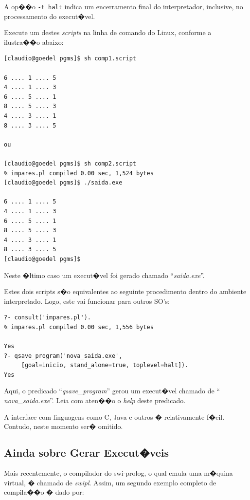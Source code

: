 \documentclass[final,a4paper]{article}
\begin{document}
 A op��o {\tt -t halt} indica um encerramento final do interpretador, 
inclusive, no processamento do execut�vel.


\newpage
Execute um destes {\em scripts} na linha de comando do
Linux, conforme a ilustra��o abaixo:
{\small
\begin{verbatim}
[claudio@goedel pgms]$ sh comp1.script

6 .... 1 .... 5
4 .... 1 .... 3
6 .... 5 .... 1
8 .... 5 .... 3
4 .... 3 .... 1
8 .... 3 .... 5

ou

[claudio@goedel pgms]$ sh comp2.script
% impares.pl compiled 0.00 sec, 1,524 bytes
[claudio@goedel pgms]$ ./saida.exe

6 .... 1 .... 5
4 .... 1 .... 3
6 .... 5 .... 1
8 .... 5 .... 3
4 .... 3 .... 1
8 .... 3 .... 5
[claudio@goedel pgms]$
\end{verbatim}
}

Neste �ltimo caso um execut�vel foi gerado
chamado ``{\em saida.exe}''.

\newpage
{} Estes dois scripts s�o equivalentes ao seguinte
procedimento dentro do ambiente interpretado. Logo, este vai funcionar para outros SO's:


\begin{verbatim}
?- consult('impares.pl').
% impares.pl compiled 0.00 sec, 1,556 bytes

Yes
?- qsave_program('nova_saida.exe', 
     [goal=inicio, stand_alone=true, toplevel=halt]).
Yes
\end{verbatim}


Aqui, o predicado ``{\em qsave\_program}''
 gerou um execut�vel chamado de ``{\em
nova\_saida.exe}''. Leia com aten��o o {\em
help} deste predicado.

A interface com linguagens como C, Java e outros �
relativamente f�cil. Contudo, neste momento ser�
omitido.

\newpage
\subsection{Ainda sobre Gerar Execut�veis}

 Mais recentemente, o compilador do swi-prolog, o qual emula
uma m�quina virtual,  � chamado de {\em swipl}. Assim, um segundo
exemplo completo de compila��o � dado por:
\end{document}
